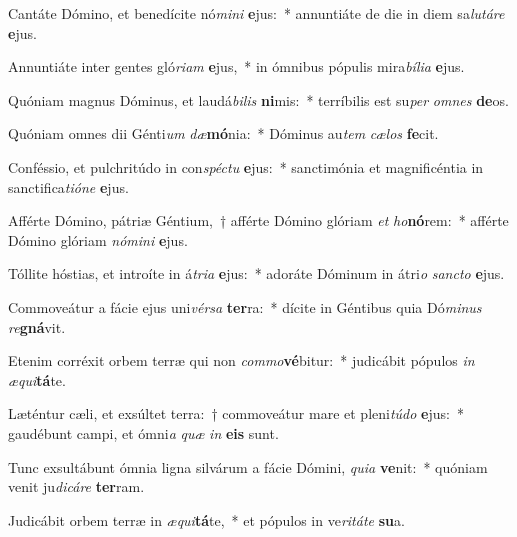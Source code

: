 \item Cantáte Dómino, et benedícite nó\textit{mi}\textit{ni} \textbf{e}jus:~* annuntiáte de die in diem sa\textit{lu}\textit{tá}\textit{re} \textbf{e}jus.
\item Annuntiáte inter gentes gló\textit{ri}\textit{am} \textbf{e}jus,~* in ómnibus pópulis mira\textit{bí}\textit{li}\textit{a} \textbf{e}jus.
\item Quóniam magnus Dóminus, et laudá\textit{bi}\textit{lis} \textbf{ni}mis:~* terríbilis est su\textit{per} \textit{om}\textit{nes} \textbf{de}os.
\item Quóniam omnes dii Génti\textit{um} \textit{dæ}\textbf{mó}nia:~* Dóminus au\textit{tem} \textit{cæ}\textit{los} \textbf{fe}cit.
\item Conféssio, et pulchritúdo in con\textit{spéc}\textit{tu} \textbf{e}jus:~* sanctimónia et magnificéntia in sanctifica\textit{ti}\textit{ó}\textit{ne} \textbf{e}jus.
\item Afférte Dómino, pátriæ Géntium,~† afférte Dómino glóriam \textit{et} \textit{ho}\textbf{nó}rem:~* afférte Dómino glóriam \textit{nó}\textit{mi}\textit{ni} \textbf{e}jus.
\item Tóllite hóstias, et introíte in á\textit{tri}\textit{a} \textbf{e}jus:~* adoráte Dóminum in átri\textit{o} \textit{sanc}\textit{to} \textbf{e}jus.
\item Commoveátur a fácie ejus uni\textit{vér}\textit{sa} \textbf{ter}ra:~* dícite in Géntibus quia Dó\textit{mi}\textit{nus} \textit{re}\textbf{gná}vit.
\item Etenim corréxit orbem terræ qui non \textit{com}\textit{mo}\textbf{vé}bitur:~* judicábit pópulos \textit{in} \textit{æ}\textit{qui}\textbf{tá}te.
\item Læténtur cæli, et exsúltet terra:~† commoveátur mare et pleni\textit{tú}\textit{do} \textbf{e}jus:~* gaudébunt campi, et ómni\textit{a} \textit{quæ} \textit{in} \textbf{e}\textbf{is} sunt.
\item Tunc exsultábunt ómnia ligna silvárum a fácie Dómini, \textit{qui}\textit{a} \textbf{ve}nit:~* quóniam venit ju\textit{di}\textit{cá}\textit{re} \textbf{ter}ram.
\item Judicábit orbem terræ in \textit{æ}\textit{qui}\textbf{tá}te,~* et pópulos in ve\textit{ri}\textit{tá}\textit{te} \textbf{su}a.
